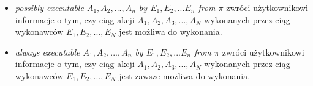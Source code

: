 \documentclass[a4paper]{article}
\begin{document}
    \begin{itemize}
        \item \textit{ possibly executable $A_1, A_2, ..., A_n$ by $E_1, E_2, ... E_n$ from $\pi$ }
            zwróci użytkownikowi informacje o tym, czy ciąg akcji 
            $A_1, A_2, A_3, ..., A_N$ wykonanych przez ciąg wykonawców
            $E_1, E_2, ..., E_N$ jest możliwa do wykonania.
        \item \textit{ always executable  $A_1, A_2, ..., A_n$ by $E_1, E_2, ... E_n$ from $\pi$  }
            zwróci użytkownikowi informacje o tym, czy ciąg akcji
            $A_1, A_2, A_3, ..., A_N$ wykonanych przez ciąg wykonawców
            $E_1, E_2, ..., E_N$ jest zawsze możliwa do wykonania.

    \end{itemize}
\end{document}
